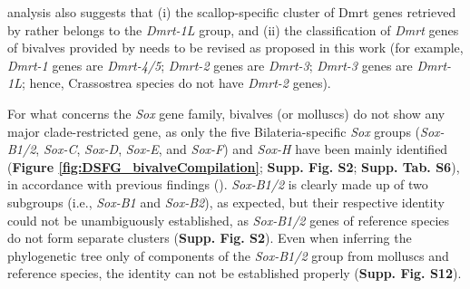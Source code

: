 \documentclass[../main.tex]{subfiles}
\begin{document}
analysis also suggests that (i) the scallop-specific cluster of Dmrt genes retrieved by \textbf{\cite{wang2023genome}} rather belongs to the \textit{Dmrt-1L} group, and (ii) the classification of \textit{Dmrt} genes of bivalves provided by \textbf{\cite{zeng2024genome}} needs to be revised as proposed in this work (for example, \textit{Dmrt-1} genes are \textit{Dmrt-4/5}; \textit{Dmrt-2} genes are \textit{Dmrt-3}; \textit{Dmrt-3} genes are \textit{Dmrt-1L}; hence, Crassostrea species do not have \textit{Dmrt-2} genes).

For what concerns the \textit{Sox} gene family, bivalves (or molluscs) do not show any major clade-restricted gene, as only the five Bilateria-specific \textit{Sox} groups (\textit{Sox-B1/2}, \textit{Sox-C}, \textit{Sox-D}, \textit{Sox-E}, and \textit{Sox-F}) and \textit{Sox-H} have been mainly identified (\textbf{Figure \ref{fig:DSFG_bivalveCompilation}}; \textbf{Supp. Fig. S2}; \textbf{Supp. Tab. S6}), in accordance with previous findings (\textbf{\cite{yu2017genome,evensen2022comparative,wang2024genome}}). \textit{Sox-B1/2} is clearly made up of two subgroups (i.e., \textit{Sox-B1} and \textit{Sox-B2}), as expected, but their respective identity could not be unambiguously established, as \textit{Sox-B1/2} genes of reference species do not form separate clusters (\textbf{Supp. Fig. S2}). Even when inferring the phylogenetic tree only of components of the \textit{Sox-B1/2} group from molluscs and reference species, the identity can not be established properly (\textbf{Supp. Fig. S12}).
\end{document}
